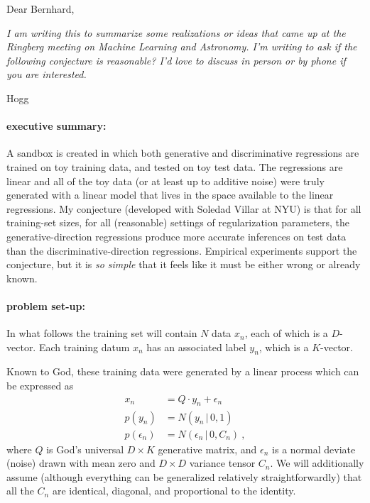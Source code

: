 \documentclass[12pt]{article}
\newcommand{\given}{\,|\,}
\begin{document}
\noindent
Dear Bernhard,

\emph{I am writing this to summarize some realizations or ideas that came up
at the Ringberg meeting on Machine Learning and Astronomy. I'm writing
to ask if the following conjecture is reasonable? I'd love to discuss
in person or by phone if you are interested.}

Hogg

\paragraph{executive summary:}
A sandbox is created in which both generative and discriminative
regressions are trained on toy training data, and tested on toy test
data.
The regressions are linear and all of the toy data (or at least up to
additive noise) were truly generated with a linear model that lives in
the space available to the linear regressions.
My conjecture (developed with Soledad Villar at NYU) is that for all
training-set sizes, for all (reasonable) settings of regularization parameters,
the generative-direction regressions produce more accurate inferences on
test data than the discriminative-direction regressions.
Empirical experiments support the conjecture, but it is \emph{so simple}
that it feels like it must be either wrong or already known.

\paragraph{problem set-up:}
In what follows the training set will contain $N$ data $x_n$, each of
which is a $D$-vector.
Each training datum $x_n$ has an associated label $y_n$, which is a
$K$-vector.

Known to God, these training data were generated by a linear process
which can be expressed as
\begin{align}
x_n &= Q \cdot y_n + \epsilon_n \\
p(y_n) &= N(y_n\given 0, 1) \\
p(\epsilon_n) &= N(\epsilon_n\given 0, C_n)
~,
\end{align}
where $Q$ is God's universal $D\times K$ generative matrix, and
$\epsilon_n$ is a normal deviate (noise) drawn with mean zero and
$D\times D$ variance tensor $C_n$.
We will additionally assume (although everything can be generalized
relatively straightforwardly) that all the $C_n$ are identical,
diagonal, and proportional to the identity.
\end{document}
